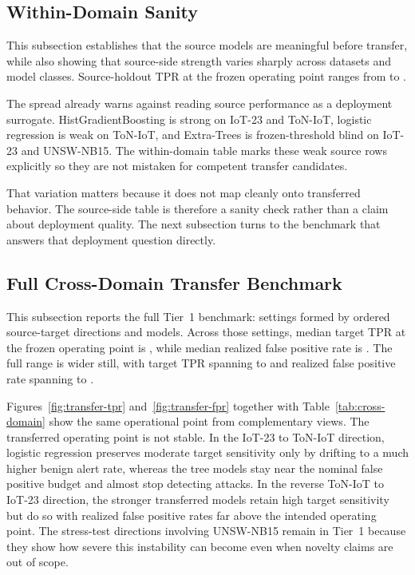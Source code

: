 \documentclass[preprint,12pt]{elsarticle}
\begin{document}
\subsection{Within-Domain Sanity}

This subsection establishes that the source models are meaningful before transfer, while also showing that source-side strength varies sharply across datasets and model classes. Source-holdout TPR at the frozen operating point ranges from \WithinHoldoutMin{} to \WithinHoldoutMax{}.

The spread already warns against reading source performance as a deployment surrogate. HistGradientBoosting is strong on IoT-23 and ToN-IoT, logistic regression is weak on ToN-IoT, and Extra-Trees is frozen-threshold blind on IoT-23 and UNSW-NB15. The within-domain table marks these weak source rows explicitly so they are not mistaken for competent transfer candidates.



That variation matters because it does not map cleanly onto transferred behavior. The source-side table is therefore a sanity check rather than a claim about deployment quality. The next subsection turns to the benchmark that answers that deployment question directly.

\FloatBarrier

\subsection{Full Cross-Domain Transfer Benchmark}

This subsection reports the full Tier~1 benchmark: \NaturalSettingCount{} settings formed by \DirectionCount{} ordered source-target directions and \ModelCount{} models. Across those settings, median target TPR at the frozen operating point is \AllNaturalMedianTargetTpr{}, while median realized false positive rate is \AllNaturalMedianRealizedFpr{}. The full range is wider still, with target TPR spanning \AllNaturalMinTargetTpr{} to \AllNaturalMaxTargetTpr{} and realized false positive rate spanning \AllNaturalMinRealizedFpr{} to \AllNaturalMaxRealizedFpr{}.

Figures~\ref{fig:transfer-tpr} and~\ref{fig:transfer-fpr} together with Table~\ref{tab:cross-domain} show the same operational point from complementary views. The transferred operating point is not stable. In the IoT-23 to ToN-IoT direction, logistic regression preserves moderate target sensitivity only by drifting to a much higher benign alert rate, whereas the tree models stay near the nominal false positive budget and almost stop detecting attacks. In the reverse ToN-IoT to IoT-23 direction, the stronger transferred models retain high target sensitivity but do so with realized false positive rates far above the intended operating point. The stress-test directions involving UNSW-NB15 remain in Tier~1 because they show how severe this instability can become even when novelty claims are out of scope.
\end{document}
